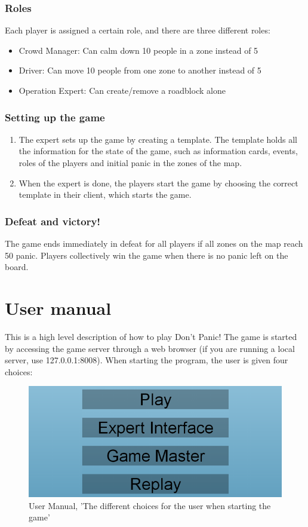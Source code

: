 \subsection*{Roles}
Each player is assigned a certain role, and there are three different roles:
\begin{itemize}
	\item Crowd Manager: Can calm down 10 people in a zone instead of 5
	\item Driver: Can move 10 people from one zone to another instead of 5
	\item Operation Expert: Can create/remove a roadblock alone
\end{itemize}
%
\subsection*{Setting up the game}
\begin{enumerate}
	\item The expert sets up the game by creating a template. The template holds all the information for the state of the game, such as information cards, events, roles of the players and initial panic in the zones of the map.
	\item When the expert is done, the players start the game by choosing the correct template in their client, which starts the game.
\end{enumerate}
%
\subsection*{Defeat and victory!}
The game ends immediately in defeat for all players if all zones on the map reach 50 panic. Players collectively win the game when there is no panic left on the board.


\chapter{User manual}
\label{appendix:D}
%
This is a high level description of how to play Don't Panic! The game is started by accessing the game server through a web browser (if you are running a local server, use 127.0.0.1:8008). When starting the program, the user is given four choices:

\begin{figure}[H]
  \centering
    \includegraphics[width=1.0\textwidth]{img/choices.png}
  \caption{User Manual, 'The different choices for the user when starting the game'}
  \label{fig:choices}
\end{figure}

